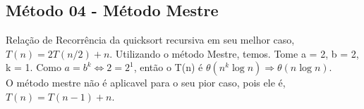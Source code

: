 \subsection{Método 04 - Método Mestre}
Relação de Recorrência da quicksort recursiva em seu melhor caso, $T(n) = 2T(n/2) + n$. Utilizando o método Mestre, temos.
Tome a = 2, b = 2, k = 1. Como $a = b^k \Leftrightarrow 2 = 2^1$, então o T(n) é $\theta(n^k \log{n}) \Rightarrow \theta(n \log{n})$. \\
O método mestre não é aplicavel para o seu pior caso, pois ele é, $T(n) = T(n-1) + n$.